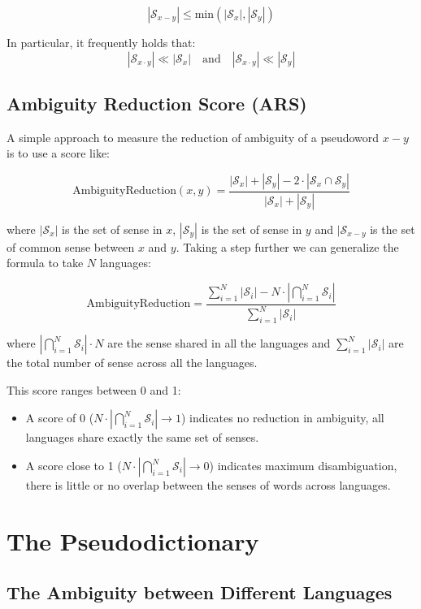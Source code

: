 \documentclass[runningheads]{llncs}
\begin{document}
\[
  |\mathcal{S}_{x-y}| \leq \text{min}(|\mathcal{S}_x|, |\mathcal{S}_y|)
\]

In particular, it frequently holds that:
\[
|\mathcal{S}_{x \cdot y}| \ll |\mathcal{S}_x| \quad \text{and} \quad |\mathcal{S}_{x \cdot y}| \ll |\mathcal{S}_y|
\]

\subsection{Ambiguity Reduction Score (ARS)}

A simple approach to measure the reduction of ambiguity of a pseudoword $x-y$ is to use a score like: 

\[
  \text{AmbiguityReduction}(x, y) = \frac{|\mathcal{S}_x| + |\mathcal{S}_y| - 2 \cdot |\mathcal{S}_x \cap \mathcal{S}_y|}{|\mathcal{S}_x| + |\mathcal{S}_y|}
\]

where $|\mathcal{S}_x|$ is the set of sense in $x$, $|\mathcal{S}_y|$ is the set of sense in $y$ and $|\mathcal{S}_{x-y}$ is the set of common sense between $x$ and $y$. Taking a step further we can generalize the formula to take $N$ languages: 


\[
  \text{AmbiguityReduction} = \frac{\sum_{i=1}^N |\mathcal{S}_i| - N \cdot \left|\bigcap_{i=1}^N \mathcal{S}_i\right|}{\sum_{i=1}^N |\mathcal{S}_i|}
\]

where $|\bigcap_{i=1}^N \mathcal{S}_i| \cdot N$ are the sense shared in all the languages and $\sum_{i=1}^N |\mathcal{S}_i|$ are the total number of sense across all the languages.

This score ranges between 0 and 1:
\begin{itemize}
  \item A score of 0 ($N \cdot \left|\bigcap_{i=1}^N \mathcal{S}_i\right| \rightarrow 1$) indicates no reduction in ambiguity, all languages share exactly the same set of senses.
  \item A score close to 1 ($N \cdot \left|\bigcap_{i=1}^N \mathcal{S}_i\right| \rightarrow 0$) indicates maximum disambiguation, there is little or no overlap between the senses of words across languages.
\end{itemize}

\section{The Pseudodictionary}

\subsection{The Ambiguity between Different Languages}
\end{document}
